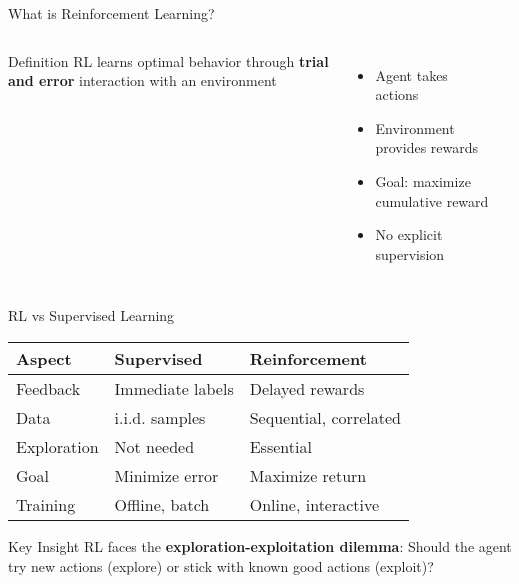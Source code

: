 \documentclass[aspectratio=169,10pt]{beamer}
\begin{document}
\begin{frame}{What is Reinforcement Learning?}
\begin{columns}
\begin{block}{Definition}
RL learns optimal behavior through \textbf{trial and error} interaction with an environment
\end{block}

\begin{itemize}
    \item Agent takes actions
    \item Environment provides rewards
    \item Goal: maximize cumulative reward
    \item No explicit supervision
\end{itemize}

\begin{center}
\end{center}
\end{columns}
\end{frame}

\begin{frame}{RL vs Supervised Learning}
\begin{table}
\centering
\small
\begin{tabular}{|l|l|l|}
\hline
\textbf{Aspect} & \textbf{Supervised} & \textbf{Reinforcement} \\
\hline
Feedback & Immediate labels & Delayed rewards \\
Data & i.i.d. samples & Sequential, correlated \\
Exploration & Not needed & Essential \\
Goal & Minimize error & Maximize return \\
Training & Offline, batch & Online, interactive \\
\hline
\end{tabular}
\end{table}

\begin{block}{Key Insight}
RL faces the \textbf{exploration-exploitation dilemma}: 
Should the agent try new actions (explore) or stick with known good actions (exploit)?
\end{block}
\end{frame}
\end{document}
